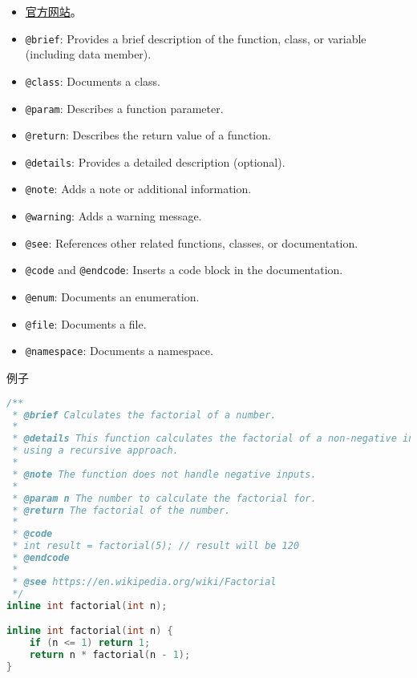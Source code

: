 
\begin{itemize}
\item \href{https://www.doxygen.nl/}{官方网站}。
\item \verb`@brief`: Provides a brief description of the function, class, or variable (including data member).
\item \verb`@class`: Documents a class.
\item \verb`@param`: Describes a function parameter.
\item \verb`@return`: Describes the return value of a function.
\item \verb`@details`: Provides a detailed description (optional).
\item \verb`@note`: Adds a note or additional information.
\item \verb`@warning`: Adds a warning message.
\item \verb`@see`: References other related functions, classes, or documentation.
\item \verb`@code` and \verb`@endcode`: Inserts a code block in the documentation.
\item \verb`@enum`: Documents an enumeration.
\item \verb`@file`: Documents a file.
\item \verb`@namespace`: Documents a namespace.
\end{itemize}

例子
\begin{lstlisting}[language=cpp,caption=factorial.hpp]
/**
 * @brief Calculates the factorial of a number.
 *
 * @details This function calculates the factorial of a non-negative integer
 * using a recursive approach.
 *
 * @note The function does not handle negative inputs.
 *
 * @param n The number to calculate the factorial for.
 * @return The factorial of the number.
 *
 * @code
 * int result = factorial(5); // result will be 120
 * @endcode
 *
 * @see https://en.wikipedia.org/wiki/Factorial
 */
inline int factorial(int n);

inline int factorial(int n) {
    if (n <= 1) return 1;
    return n * factorial(n - 1);
}
\end{lstlisting}

